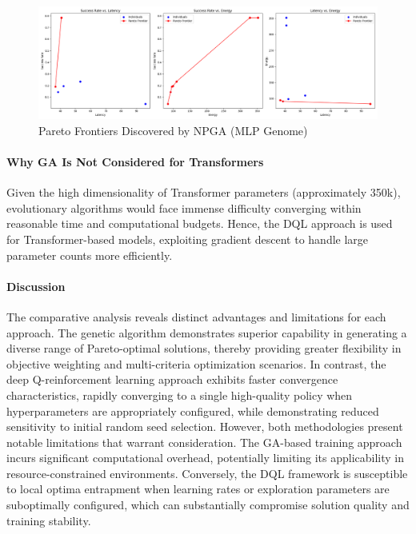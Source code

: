 \documentclass[preprint,3p,authoryear]{elsarticle}
\begin{document}
\begin{figure}[H]
    \centering
    \includegraphics[width=0.9\linewidth]{figs/pareto_frontiers_npga.png}
    \caption{Pareto Frontiers Discovered by NPGA (MLP Genome)}
    \label{fig:npga-pareto-frontiers}
\end{figure}

\paragraph{Why GA Is Not Considered for Transformers}
Given the high dimensionality of Transformer parameters (approximately 350k), evolutionary algorithms would face immense difficulty converging within reasonable time and computational budgets. Hence, the DQL approach is used for Transformer-based models, exploiting gradient descent to handle large parameter counts more efficiently.

\paragraph{Discussion}
The comparative analysis reveals distinct advantages and limitations for each approach. The genetic algorithm demonstrates superior capability in generating a diverse range of Pareto-optimal solutions, thereby providing greater flexibility in objective weighting and multi-criteria optimization scenarios. In contrast, the deep Q-reinforcement learning approach exhibits faster convergence characteristics, rapidly converging to a single high-quality policy when hyperparameters are appropriately configured, while demonstrating reduced sensitivity to initial random seed selection. However, both methodologies present notable limitations that warrant consideration. The GA-based training approach incurs significant computational overhead, potentially limiting its applicability in resource-constrained environments. Conversely, the DQL framework is susceptible to local optima entrapment when learning rates or exploration parameters are suboptimally configured, which can substantially compromise solution quality and training stability.
\end{document}
